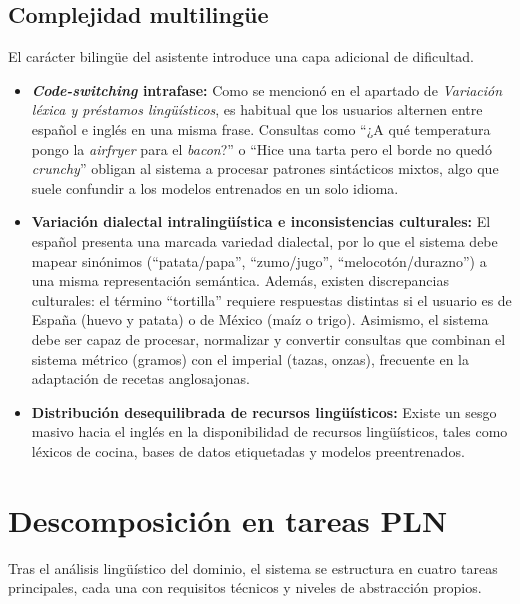 \documentclass[11pt,a4paper,twoside]{article}
\theoremstyle{definition}
\numberwithin{equation}{section}
\begin{document}
\subsection{Complejidad multilingüe}
El carácter bilingüe del asistente introduce una capa adicional de dificultad.
\begin{itemize}
    \item \textbf{\textit{Code-switching} intrafase:} Como se mencionó en el apartado de \textit{Variación léxica y préstamos lingüísticos}, es habitual que los usuarios alternen entre español e inglés en una misma frase. Consultas como ``¿A qué temperatura pongo la \textit{airfryer} para el \textit{bacon}?'' o ``Hice una tarta pero el borde no quedó \textit{crunchy}'' obligan al sistema a procesar patrones sintácticos mixtos, algo que suele confundir a los modelos entrenados en un solo idioma.

    \item \textbf{Variación dialectal intralingüística e inconsistencias culturales:} El español presenta una marcada variedad dialectal, por lo que el sistema debe mapear sinónimos (``patata/papa'', ``zumo/jugo'', ``melocotón/durazno'') a una misma representación semántica. Además, existen discrepancias culturales: el término ``tortilla'' requiere respuestas distintas si el usuario es de España (huevo y patata) o de México (maíz o trigo). Asimismo, el sistema debe ser capaz de procesar, normalizar y convertir consultas que combinan el sistema métrico (gramos) con el imperial (tazas, onzas), frecuente en la adaptación de recetas anglosajonas.

    \item \textbf{Distribución desequilibrada de recursos lingüísticos:} Existe un sesgo masivo hacia el inglés en la disponibilidad de recursos lingüísticos, tales como léxicos de cocina, bases de datos etiquetadas y modelos preentrenados.
\end{itemize}


\section{Descomposición en tareas PLN}
Tras el análisis lingüístico del dominio, el sistema se estructura en cuatro tareas principales, cada una con requisitos técnicos y niveles de abstracción propios.
\end{document}
